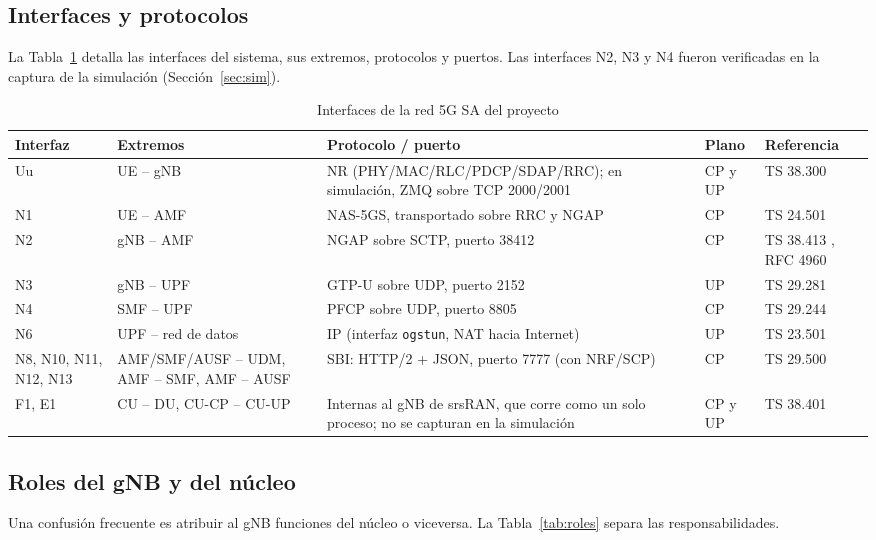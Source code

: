 \documentclass[conference]{IEEEtran}
\begin{document}
\subsection{Interfaces y protocolos}
La Tabla~\ref{tab:interfaces} detalla las interfaces del sistema, sus extremos, protocolos y puertos. Las interfaces N2, N3 y N4 fueron verificadas en la captura de la simulación (Sección~\ref{sec:sim}).

\begin{table}[!t]
\caption{Interfaces de la red 5G SA del proyecto}
\label{tab:interfaces}
\centering
\footnotesize
\renewcommand{\arraystretch}{1.15}
\begin{tabular}{p{1.4cm}p{2.6cm}p{5.8cm}p{1.5cm}p{4.5cm}}
\toprule
\textbf{Interfaz} & \textbf{Extremos} & \textbf{Protocolo / puerto} & \textbf{Plano} & \textbf{Referencia} \\
\midrule
Uu & UE -- gNB & NR (PHY/MAC/RLC/PDCP/SDAP/RRC); en simulación, ZMQ sobre TCP 2000/2001 & CP y UP & TS 38.300 \cite{ts38300} \\
N1 & UE -- AMF & NAS-5GS, transportado sobre RRC y NGAP & CP & TS 24.501 \cite{ts24501} \\
N2 & gNB -- AMF & NGAP sobre SCTP, puerto 38412 & CP & TS 38.413 \cite{ts38413}, RFC 4960 \cite{rfc4960} \\
N3 & gNB -- UPF & GTP-U sobre UDP, puerto 2152 & UP & TS 29.281 \cite{ts29281} \\
N4 & SMF -- UPF & PFCP sobre UDP, puerto 8805 & CP & TS 29.244 \cite{ts29244} \\
N6 & UPF -- red de datos & IP (interfaz \texttt{ogstun}, NAT hacia Internet) & UP & TS 23.501 \cite{ts23501} \\
N8, N10, N11, N12, N13 & AMF/SMF/AUSF -- UDM, AMF -- SMF, AMF -- AUSF & SBI: HTTP/2 + JSON, puerto 7777 (con NRF/SCP) & CP & TS 29.500 \cite{ts29500} \\
F1, E1 & CU -- DU, CU-CP -- CU-UP & Internas al gNB de srsRAN, que corre como un solo proceso; no se capturan en la simulación & CP y UP & TS 38.401 \cite{ts38401} \\
\bottomrule
\end{tabular}
\end{table}

\subsection{Roles del gNB y del núcleo}
Una confusión frecuente es atribuir al gNB funciones del núcleo o viceversa. La Tabla~\ref{tab:roles} separa las responsabilidades.
\end{document}

